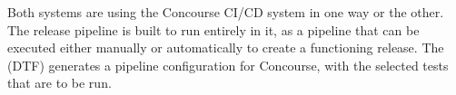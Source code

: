 Both systems are using the Concourse CI/CD system in one way or the other.
The release pipeline is built to run entirely in it, as a pipeline that can be executed either manually or automatically to create a functioning release.
The (DTF) generates a pipeline configuration for Concourse, with the selected tests that are to be run.

